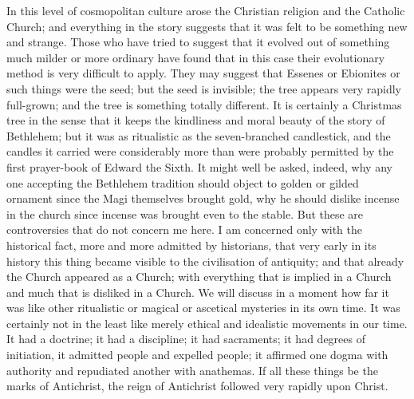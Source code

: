 In this level of cosmopolitan culture arose the Christian religion and the Catholic Church; and everything in the story suggests that it was felt to be something new and strange. Those who have tried to suggest that it evolved out of something much milder or more ordinary have found that in this case their evolutionary method is very difficult to apply. They may suggest that Essenes or Ebionites or such things were the seed; but the seed is invisible; the tree appears very rapidly full-grown; and the tree is something totally different. It is certainly a Christmas tree in the sense that it keeps the kindliness and moral beauty of the story of Bethlehem; but it was as ritualistic as the seven-branched candlestick, and the candles it carried were considerably more than were probably permitted by the first prayer-book of Edward the Sixth. It might well be asked, indeed, why any one accepting the Bethlehem tradition should object to golden or gilded ornament since the Magi themselves brought gold, why he should dislike incense in the church since incense was brought even to the stable. But these are controversies that do not concern me here. I am concerned only with the historical fact, more and more admitted by historians, that very early in its history this thing became visible to the civilisation of antiquity; and that already the Church appeared as a Church; with everything that is implied in a Church and much that is disliked in a Church. We will discuss in a moment how far it was like other ritualistic or magical or ascetical mysteries in its own time. It was certainly not in the least like merely ethical and idealistic movements in our time. It had a doctrine; it had a discipline; it had sacraments; it had degrees of initiation, it admitted people and expelled people; it affirmed one dogma with authority and repudiated another with anathemas. If all these things be the marks of Antichrist, the reign of Antichrist followed very rapidly upon Christ.

